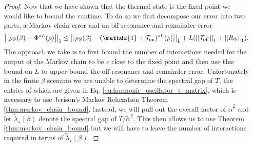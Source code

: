 \documentclass{article}
\newcommand{\on}{\rm on}
\newcommand{\off}{\rm off}
\newcommand{\norm}[1]{\left|\left| #1 \right|\right|}
\newcommand{\TT}{\mathcal{T}}
\newcommand{\identity}{\mathds{1}}
\begin{document}
\begin{proof}
    Now that we have shown that the thermal state is the fixed point we would like to bound the runtime. To do so we first decompose our error into two parts, a Markov chain error and an off-resonance and remainder error
    \begin{equation}
        \norm{\rho_S(\beta) - \Phi^{\circ L}(\rho)}_1 \le \norm{\rho_S(\beta) - (\identity + \TT_{\on})^{\circ L}(\rho)}_1 + L(\norm{\TT_{\off}}_1 + \norm{R_{\Phi}}_1 ). \label{eq:harmonic_oscillator_error_breakdown}
    \end{equation}
    The approach we take is to first bound the number of interactions needed for the output of the Markov chain to be $\epsilon$ close to the fixed point and then use this bound on $L$ to upper bound the off-resonance and remainder error. Unfortunately in the finite $\beta$ scenario we are unable to determine the spectral gap of $T$, the entries of which are given in Eq. \eqref{eq:harmonic_oscillator_t_matrix}, which is necessary to use Jerison's Markov Relaxation Theorem \ref{thm:markov_chain_bound}. Instead, we will pull out the overall factor of $\widetilde{\alpha}^2$ and let $\widetilde{\lambda}_\star(\beta)$ denote the spectral gap of $T/\widetilde{\alpha}^2$. This then allows us to use Theorem \ref{thm:markov_chain_bound} but we will have to leave the number of interactions required in terms of $\widetilde{\lambda}_\star(\beta)$.


\end{proof}
\end{document}
